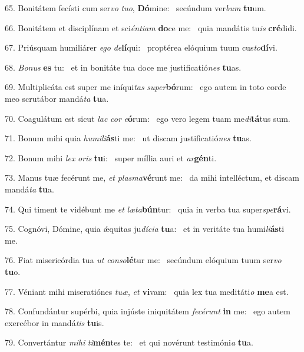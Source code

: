 65. Bonitátem fecísti cum ser\textit{vo} \textit{tu}\textit{o}, \textbf{Dó}mine: \ast\  secúndum ver\textit{bum} \textbf{tu}um.\

66. Bonitátem et disciplínam et sci\textit{én}\textit{ti}\textit{am} \textbf{do}ce me: \ast\  quia mandátis tu\textit{is} \textbf{cré}didi.\

67. Priúsquam humiliárer \textit{e}\textit{go} \textit{de}\textbf{lí}qui: \ast\  proptérea elóquium tuum cus\textit{to}\textbf{dí}vi.\

68. \textit{Bo}\textit{nus} \textbf{es} tu: \ast\  et in bonitáte tua doce me justificatió\textit{nes} \textbf{tu}as.\

69. Multiplicáta est super me iníqui\textit{tas} \textit{su}\textit{per}\textbf{bó}rum: \ast\  ego autem in toto corde meo scrutábor mandá\textit{ta} \textbf{tu}a.\

70. Coagulátum est sicut \textit{lac} \textit{cor} \textit{e}\textbf{ó}rum: \ast\  ego vero legem tuam me\textit{di}\textbf{tá}tus sum.\

71. Bonum mihi quia \textit{hu}\textit{mi}\textit{li}\textbf{ás}ti me: \ast\  ut discam justificatió\textit{nes} \textbf{tu}as.\

72. Bonum mihi \textit{lex} \textit{o}\textit{ris} \textbf{tu}i: \ast\  super míllia auri et \textit{ar}\textbf{gén}ti.\

73. Manus tuæ fecérunt me, \textit{et} \textit{plas}\textit{ma}\textbf{vé}runt me: \ast\  da mihi intelléctum, et discam mandá\textit{ta} \textbf{tu}a.\

74. Qui timent te vidébunt me \textit{et} \textit{læ}\textit{ta}\textbf{bún}tur: \ast\  quia in verba tua super\textit{spe}\textbf{rá}vi.\

75. Cognóvi, Dómine, quia ǽquitas ju\textit{dí}\textit{ci}\textit{a} \textbf{tu}a: \ast\  et in veritáte tua humi\textit{li}\textbf{ás}ti me.\

76. Fiat misericórdia tua \textit{ut} \textit{con}\textit{so}\textbf{lé}tur me: \ast\  secúndum elóquium tuum ser\textit{vo} \textbf{tu}o.\

77. Véniant mihi miseratiónes \textit{tu}\textit{æ}, \textit{et} \textbf{vi}vam: \ast\  quia lex tua meditáti\textit{o} \textbf{me}a est.\

78. Confundántur supérbi, quia injúste iniquitátem \textit{fe}\textit{cé}\textit{runt} \textbf{in} me: \ast\  ego autem exercébor in mandá\textit{tis} \textbf{tu}is.\

79. Convertántur \textit{mi}\textit{hi} \textit{ti}\textbf{mén}tes te: \ast\  et qui novérunt testimóni\textit{a} \textbf{tu}a.\

